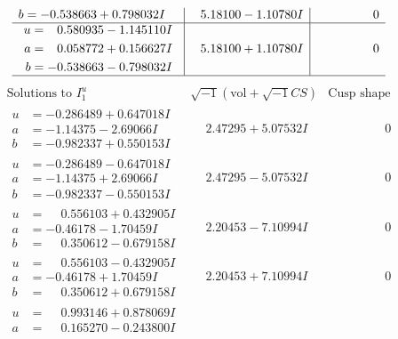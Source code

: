 \documentclass[1p]{elsarticle_modified}
\theoremstyle{definition}
\newcommand{\I}{\sqrt{-1}}
\begin{document}
$$\begin{array}{c|c|c}
\begin{aligned}
b &= -0.538663 + 0.798032 I\end{aligned}
 & \phantom{-}5.18100 - 1.10780 I & \phantom{-0.000000 } 0 \\ \hline\begin{aligned}
u &= \phantom{-}0.580935 - 1.145110 I \\
a &= \phantom{-}0.058772 + 0.156627 I \\
b &= -0.538663 - 0.798032 I\end{aligned}
 & \phantom{-}5.18100 + 1.10780 I & \phantom{-0.000000 } 0\\
 \hline 
 \end{array}$$\newpage$$\begin{array}{c|c|c}  
\text{Solutions to }I^u_{1}& \I (\text{vol} + \sqrt{-1}CS) & \text{Cusp shape}\\
 \hline 
\begin{aligned}
u &= -0.286489 + 0.647018 I \\
a &= -1.14375 - 2.69066 I \\
b &= -0.982337 + 0.550153 I\end{aligned}
 & \phantom{-}2.47295 + 5.07532 I & \phantom{-0.000000 } 0 \\ \hline\begin{aligned}
u &= -0.286489 - 0.647018 I \\
a &= -1.14375 + 2.69066 I \\
b &= -0.982337 - 0.550153 I\end{aligned}
 & \phantom{-}2.47295 - 5.07532 I & \phantom{-0.000000 } 0 \\ \hline\begin{aligned}
u &= \phantom{-}0.556103 + 0.432905 I \\
a &= -0.46178 - 1.70459 I \\
b &= \phantom{-}0.350612 - 0.679158 I\end{aligned}
 & \phantom{-}2.20453 - 7.10994 I & \phantom{-0.000000 } 0 \\ \hline\begin{aligned}
u &= \phantom{-}0.556103 - 0.432905 I \\
a &= -0.46178 + 1.70459 I \\
b &= \phantom{-}0.350612 + 0.679158 I\end{aligned}
 & \phantom{-}2.20453 + 7.10994 I & \phantom{-0.000000 } 0 \\ \hline\begin{aligned}
u &= \phantom{-}0.993146 + 0.878069 I \\
a &= \phantom{-}0.165270 - 0.243800 I \\

\end{aligned}
\end{array}$$
\end{document}
